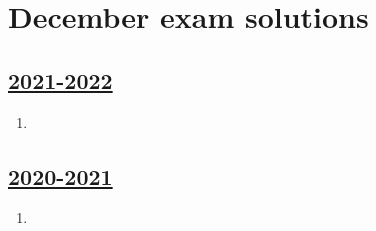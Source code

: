 
\newpage
\thispagestyle{empty}
\section{December exam solutions}
 


\subsection[2021-2022]{\hyperref[sec:kr_02_2021_2022]{2021-2022}}
\label{sec:sol_kr_02_2021_2022} %



\begin{enumerate}

\item 


\end{enumerate}
    

\subsection[2020-2021]{\hyperref[sec:kr_02_2020_2021]{2020-2021}}
\label{sec:sol_kr_02_2020_2021} %



\begin{enumerate}
    
    
    
    \item
 
 
\end{enumerate}


